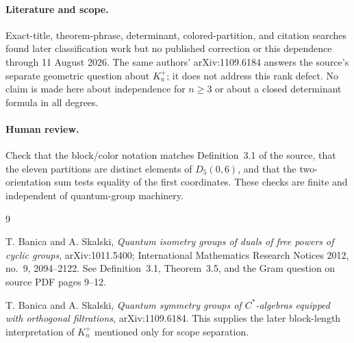 \documentclass[10pt]{article}
\begin{document}
\paragraph{Literature and scope.}
Exact-title, theorem-phrase, determinant, colored-partition, and citation
searches found later classification work but no published correction or this
dependence through 11 August 2026.  The same authors' arXiv:1109.6184 answers
the source's separate geometric question about $K_n^+$; it does not address
this rank defect.  No claim is made here about independence for $n\geq3$ or
about a closed determinant formula in all degrees.

\paragraph{Human review.}
Check that the block/color notation matches Definition~3.1 of the source,
that the eleven partitions are distinct elements of $D_5(0,6)$, and that the
two-orientation sum tests equality of the first coordinates.  These checks
are finite and independent of quantum-group machinery.

\begin{thebibliography}{9}
\raggedright
{}
T. Banica and A. Skalski,
\emph{Quantum isometry groups of duals of free powers of cyclic groups},
arXiv:1011.5400; International Mathematics Research Notices 2012,
no.~9, 2094--2122.  See Definition~3.1, Theorem~3.5, and the Gram question
on source PDF pages 9--12.

T. Banica and A. Skalski,
\emph{Quantum symmetry groups of $C^*$-algebras equipped with orthogonal
filtrations}, arXiv:1109.6184.  This supplies the later block-length
interpretation of $K_n^+$ mentioned only for scope separation.
\end{thebibliography}
\end{document}
